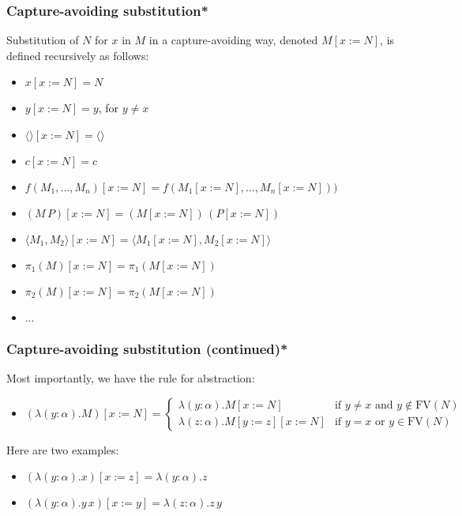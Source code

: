\documentclass[aspectratio=169]{beamer}
\begin{document}
\begin{frame}
\frametitle{Capture-avoiding substitution*}

Substitution of $N$ for $x$ in $M$ in a capture-avoiding way, denoted $M[x := N]$, is defined recursively as follows:

\begin{itemize}
    \item $x[x := N] = N$
    \item $y[x := N] = y$, for $y \neq x$
    \pause
    \item $\langle \rangle[x := N] = \langle \rangle$
    \item $c[x := N] = c$
    \pause
    \item $f(M_1, \ldots, M_n)[x := N] = f(M_1[x := N], \ldots, M_n[x := N]))$
    \item $(M \, P)[x := N] = (M[x := N]) \, (P[x := N])$
    \item $\langle M_1 , M_2 \rangle[x := N] = \langle M_1[x := N], M_2[x := N] \rangle$
    \item $\pi_1(M)[x := N] = \pi_1(M[x := N])$
    \item $\pi_2(M)[x := N] = \pi_2(M[x := N])$
    \item $\ldots$
\end{itemize}
\end{frame}

\begin{frame}
\frametitle{Capture-avoiding substitution (continued)*}

Most importantly, we have the rule for abstraction:

\begin{itemize}
    \item $(\lambda (y : \alpha). M)[x := N] =
    \begin{cases}
    \lambda (y : \alpha). M[x := N] & \text{if } y \neq x \text{ and } y \notin \text{FV}(N) \\
    \lambda (z : \alpha). M[y := z][x := N] & \text{if } y = x \text{ or } y \in \text{FV}(N)
    \end{cases}$
\end{itemize}
\pause
Here are two examples:
\begin{itemize}
    \item $(\lambda (y : \alpha). x)[x := z] = \lambda (y : \alpha). z$
    \item $(\lambda (y : \alpha). y \, x)[x := y] = \lambda (z : \alpha). z \, y$
\end{itemize}

\end{frame}
\end{document}
